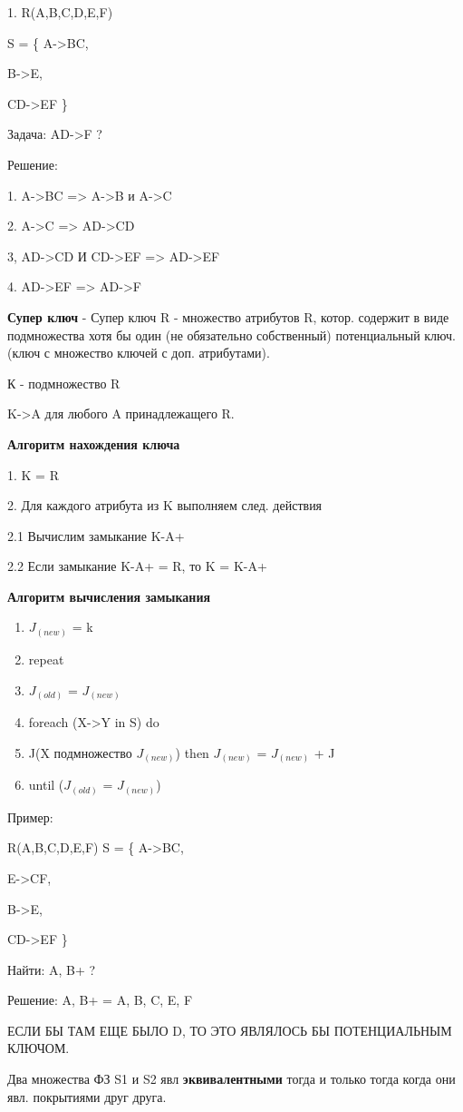 1. R(A,B,C,D,E,F)

S = \{
A->BC,

B->E,

CD->EF
\}

Задача: AD->F ?

Решение:

1. A->BC => A->B и A->C

2. A->C => AD->CD

3, AD->CD И CD->EF => AD->EF

4. AD->EF => AD->F

\textbf{Супер ключ} - Супер ключ R - множество атрибутов R,
котор. содержит в виде подмножества хотя бы один
(не обязательно собственный) потенциальный ключ.
(ключ с множество ключей с доп. атрибутами).

К - подмножество R

K->A для любого A принадлежащего R.

\textbf{Алгоритм нахождения ключа}

1. K = R

2. Для каждого атрибута из K выполняем след. действия

2.1 Вычислим замыкание {K-A}+

2.2 Если замыкание {K-A}+ = R, то K = {K-A}+

\textbf{Алгоритм вычисления замыкания}

\begin{enumerate}
	\item $J_(new)$ = k
	\item repeat
	\item $J_(old)$ = $J_(new)$
	\item foreach (X->Y in S) do
	\item J(X подмножество $J_(new)$) then $J_(new)$ = $J_(new)$ + J
	\item until ($J_(old)$ = $J_(new)$)
\end{enumerate}

Пример:

R(A,B,C,D,E,F)
S = \{
A->BC,

E->CF,

B->E,

CD->EF
\}

Найти: {A, B}+ ?


Решение: {A, B}+ = {A, B, C, E, F}

ЕСЛИ БЫ ТАМ ЕЩЕ БЫЛО D, ТО ЭТО ЯВЛЯЛОСЬ БЫ ПОТЕНЦИАЛЬНЫМ КЛЮЧОМ.

Два множества ФЗ S1 и S2 явл \textbf{эквивалентными} тогда и только тогда
когда они явл. покрытиями друг друга.

